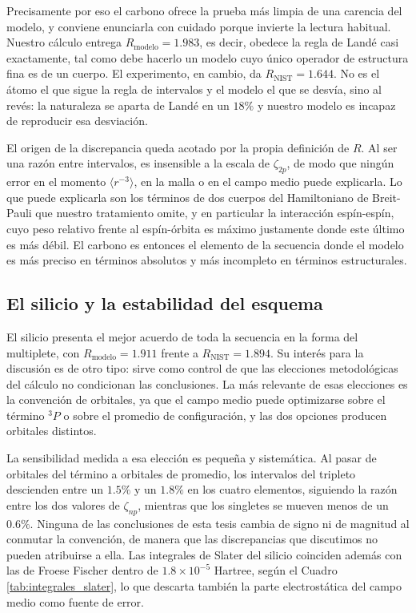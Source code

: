 Precisamente por eso el carbono ofrece la prueba más limpia de una carencia del modelo, y conviene enunciarla con cuidado porque invierte la lectura habitual. Nuestro cálculo entrega $R_{\text{modelo}} = 1.983$, es decir, obedece la regla de Landé casi exactamente, tal como debe hacerlo un modelo cuyo único operador de estructura fina es de un cuerpo. El experimento, en cambio, da $R_{\text{NIST}} = 1.644$. No es el átomo el que sigue la regla de intervalos y el modelo el que se desvía, sino al revés: la naturaleza se aparta de Landé en un $18\%$ y nuestro modelo es incapaz de reproducir esa desviación.

El origen de la discrepancia queda acotado por la propia definición de $R$. Al ser una razón entre intervalos, es insensible a la escala de $\zeta_{2p}$, de modo que ningún error en el momento $\langle r^{-3} \rangle$, en la malla o en el campo medio puede explicarla. Lo que puede explicarla son los términos de dos cuerpos del Hamiltoniano de Breit-Pauli que nuestro tratamiento omite, y en particular la interacción espín-espín, cuyo peso relativo frente al espín-órbita es máximo justamente donde este último es más débil. El carbono es entonces el elemento de la secuencia donde el modelo es más preciso en términos absolutos y más incompleto en términos estructurales.

\subsection{El silicio y la estabilidad del esquema}

El silicio presenta el mejor acuerdo de toda la secuencia en la forma del multiplete, con $R_{\text{modelo}} = 1.911$ frente a $R_{\text{NIST}} = 1.894$. Su interés para la discusión es de otro tipo: sirve como control de que las elecciones metodológicas del cálculo no condicionan las conclusiones. La más relevante de esas elecciones es la convención de orbitales, ya que el campo medio puede optimizarse sobre el término $^3P$ o sobre el promedio de configuración, y las dos opciones producen orbitales distintos.

La sensibilidad medida a esa elección es pequeña y sistemática. Al pasar de orbitales del término a orbitales de promedio, los intervalos del tripleto descienden entre un $1.5\%$ y un $1.8\%$ en los cuatro elementos, siguiendo la razón entre los dos valores de $\zeta_{np}$, mientras que los singletes se mueven menos de un $0.6\%$. Ninguna de las conclusiones de esta tesis cambia de signo ni de magnitud al conmutar la convención, de manera que las discrepancias que discutimos no pueden atribuirse a ella. Las integrales de Slater del silicio coinciden además con las de Froese Fischer dentro de $1.8\times10^{-5}$ Hartree, según el Cuadro \ref{tab:integrales_slater}, lo que descarta también la parte electrostática del campo medio como fuente de error.

